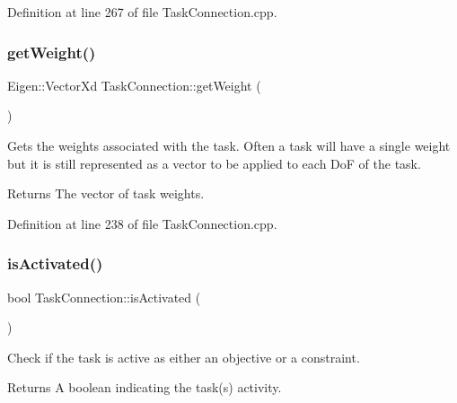 Definition at line 267 of file Task\+Connection.\+cpp.

\hypertarget{classocra__recipes_1_1TaskConnection_a44930029ade716c0ebbe04fba658cf7e}{}\label{classocra__recipes_1_1TaskConnection_a44930029ade716c0ebbe04fba658cf7e} 
\subsubsection{\texorpdfstring{get\+Weight()}{getWeight()}}
{\footnotesize\ttfamily Eigen\+::\+Vector\+Xd Task\+Connection\+::get\+Weight (\begin{DoxyParamCaption}{ }\end{DoxyParamCaption})}

Gets the weights associated with the task. Often a task will have a single weight but it is still represented as a vector to be applied to each DoF of the task.

\begin{DoxyReturn}{Returns}
The vector of task weights. 
\end{DoxyReturn}


Definition at line 238 of file Task\+Connection.\+cpp.

\hypertarget{classocra__recipes_1_1TaskConnection_a07179a0e687fd28d091eeebb1157fac0}{}\label{classocra__recipes_1_1TaskConnection_a07179a0e687fd28d091eeebb1157fac0} 
\subsubsection{\texorpdfstring{is\+Activated()}{isActivated()}}
{\footnotesize\ttfamily bool Task\+Connection\+::is\+Activated (\begin{DoxyParamCaption}{ }\end{DoxyParamCaption})}

Check if the task is active as either an objective or a constraint.

\begin{DoxyReturn}{Returns}
A boolean indicating the task(s) activity. 
\end{DoxyReturn}


